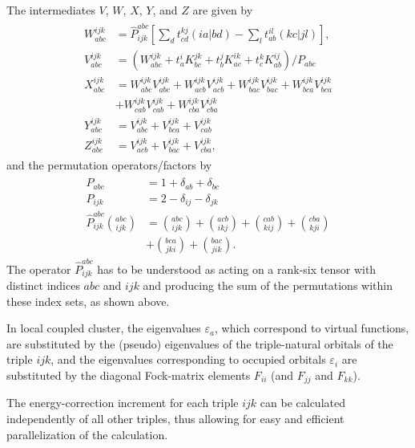 The intermediates $V$, $W$, $X$, $Y$, and $Z$ are given by
\begin{align}
  \begin{split}
    W_{abc}^{ijk} &= \hat{P}^{abc}_{ijk} \left[ \sum_d t^{kj}_{cd}(ia|bd) -\sum_l t_{ab}^{il}(kc|jl) \right],\\
    V_{abc}^{ijk} &= \left(W_{abc}^{ijk}+t_a^i K^{jk}_{bc} + t_b^j K_{ac}^{ik}+t_c^k K_{ab}^{ij} \right)/P_{abc}\\
    X_{abc}^{ijk} &= W_{abc}^{ijk}V_{abc}^{ijk}+W_{acb}^{ijk}V_{acb}^{ijk}+W_{bac}^{ijk}V_{bac}^{ijk}
                   +W_{bca}^{ijk}V_{bca}^{ijk}\\
                  &+W_{cab}^{ijk}V_{cab}^{ijk}+W_{cba}^{ijk}V_{cba}^{ijk} \\
    Y_{abc}^{ijk} &= V_{abc}^{ijk}+V_{bca}^{ijk}+V_{cab}^{ijk}\\
    Z_{abc}^{ijk} &= V_{acb}^{ijk}+V_{bac}^{ijk}+V_{cba}^{ijk},
  \end{split}
\end{align}
and the permutation operators/factors by
\begin{align}
  \begin{split}
    P_{abc} &= 1+\delta_{ab}+\delta_{bc}\\
    P_{ijk} &= 2-\delta_{ij}-\delta_{jk}\\
    \hat{P}^{abc}_{ijk} {abc\choose ijk} &= {abc\choose ijk}+{acb\choose ikj}+{cab\choose kij}+{cba\choose kji}\\
                                         &+ {bca\choose jki}+{bac\choose jik}.
  \end{split}
\end{align}
The operator $\hat{P}^{abc}_{ijk}$ has to be understood as acting on a rank-six tensor with distinct indices $abc$
and $ijk$ and producing the sum of the permutations within these index sets, as shown above.

In local coupled cluster, the eigenvalues $\varepsilon_a$, which correspond to virtual functions, are substituted
by the (pseudo) eigenvalues of the triple-natural orbitals of the triple $ijk$, and the eigenvalues
corresponding to occupied orbitals $\varepsilon_i$ are substituted by the diagonal Fock-matrix elements
$F_{ii}$ (and $F_{jj}$ and $F_{kk}$).

The energy-correction increment for each triple $ijk$ can be calculated independently of all other triples, thus
allowing for easy and efficient parallelization of the calculation.
